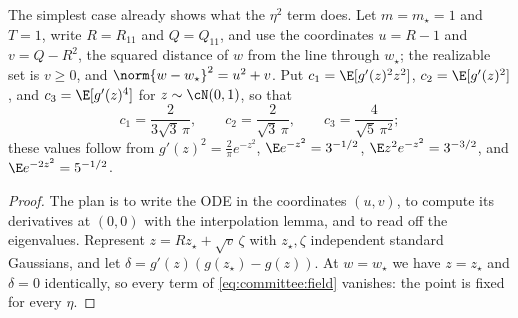 \begin{refsection}
The simplest case already shows what the $\eta^2$ term does. Let $m=m_\star=1$ and $T=1$, write $R=R_{11}$ and $Q=Q_{11}$, and use the coordinates $u=R-1$ and $v=Q-R^2$, the squared distance of $w$ from the line through $w_\star$; the realizable set is $v\ge0$, and $\norm{w-w_\star}^2=u^2+v$. Put $c_1=\E[g'(z)^2z^2]$, $c_2=\E[g'(z)^2]$, and $c_3=\E[g'(z)^4]$ for $z\sim\cN(0,1)$, so that
\[
  c_1=\frac{2}{3\sqrt3\,\pi},\qquad c_2=\frac{2}{\sqrt3\,\pi},\qquad c_3=\frac{4}{\sqrt5\,\pi^2};
\]
these values follow from $g'(z)^2=\frac2\pi e^{-z^2}$, $\E e^{-z^2}=3^{-1/2}$, $\E z^2e^{-z^2}=3^{-3/2}$, and $\E e^{-2z^2}=5^{-1/2}$.


\begin{proof}
The plan is to write the ODE in the coordinates $(u,v)$, to compute its derivatives at $(0,0)$ with the interpolation lemma, and to read off the eigenvalues. Represent $z=Rz_\star+\sqrt v\,\zeta$ with $z_\star,\zeta$ independent standard Gaussians, and let $\delta=g'(z)(g(z_\star)-g(z))$. At $w=w_\star$ we have $z=z_\star$ and $\delta=0$ identically, so every term of \eqref{eq:committee:field} vanishes: the point is fixed for every $\eta$.


\end{proof}
\end{refsection}

